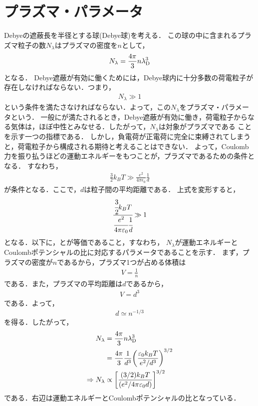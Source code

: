 \documentclass{report}
\begin{document}
  \section{プラズマ・パラメータ}
    Debyeの遮蔽長を半径とする球(Debye球)を考える．
    この球の中に含まれるプラズマ粒子の数$N_\lambda$はプラズマの密度を$n$として，
    \begin{align}
      N_\lambda = \frac{4\pi}{3}n \lambda_{\r{D}}^3
    \end{align}
    となる．
    Debye遮蔽が有効に働くためには，Debye球内に十分多数の荷電粒子が存在しなければならない．つまり，
    \begin{align}
      N_\lambda \gg 1 \label{plasma-parameter}
    \end{align}
    という条件を満たさなければならない．よって，この$N_\lambda$をプラズマ・パラメータという．
    一般にが満たされるとき，Debye遮蔽が有効に働き，荷電粒子からなる気体は，ほぼ中性とみなせる．したがって，$N_\lambda$は対象がプラズマである
    ことを示す一つの指標である．
    しかし，負電荷が正電荷に完全に束縛されてしまうと，荷電粒子から構成される期待と考えることはできない．
    よって，Coulomb力を振り払うほどの運動エネルギーをもつことが，プラズマであるための条件となる．
    すなわち，
    \begin{align}
      \frac{3}{2}k_B T \gg \frac{e^2}{4\pi\epsilon_0}\frac{1}{d}
    \end{align}
    が条件となる．ここで，$d$は粒子間の平均距離である．
    上式を変形すると，
    \begin{align}
      \cfrac{\cfrac{3}{2}k_B T}{\cfrac{e^2}{4\pi\epsilon_0}\cfrac{1}{d}} \gg 1 \label{plasma-parameter2}
    \end{align}
    となる．以下に，とが等価であること，すなわち，
    $N_\lambda$が運動エネルギーとCoulombポテンシャルの比に対応するパラメータであることを示す．
    まず，プラズマの密度が$n$であるから，プラズマ1つが占める体積は
    \begin{align}
      V = \frac{1}{n}
    \end{align}
    である．また，プラズマの平均距離は$d$であるから，
    \begin{align}
      V = d^3
    \end{align}
    である．よって，
    \begin{align}
      d \simeq n^{-1/3}
    \end{align}
    を得る．したがって，
    \begin{align}
      N_\lambda &= \frac{4\pi}{3}n \lambda_{\r{D}}^3\\
      &= \frac{4\pi}{3}\frac{1}{d^3}\qty(\frac{\epsilon_0 k_B T}{e^2/d^3})^{3/2}\\
      \Rightarrow N_\lambda &\propto \qty[\frac{(3/2)k_B T}{(e^2/4\pi\epsilon_0 d)}]^{3/2}
    \end{align}
    である．右辺は運動エネルギーとCoulombポテンシャルの比となっている．
\end{document}
